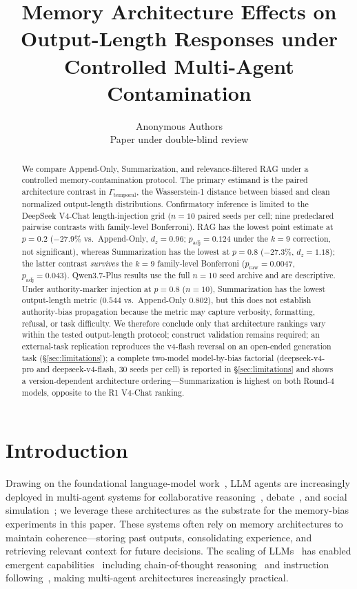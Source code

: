 \documentclass[11pt]{article}
\title{Memory Architecture Effects on Output-Length Responses under Controlled Multi-Agent Contamination}
\author{Anonymous Authors\\Paper under double-blind review}
\date{}
\begin{document}
\maketitle

\begin{abstract}
We compare Append-Only, Summarization, and relevance-filtered RAG under a controlled memory-contamination protocol. The primary estimand is the paired architecture contrast in $\Gamma_{\text{temporal}}$, the Wasserstein-1 distance between biased and clean normalized output-length distributions. Confirmatory inference is limited to the DeepSeek V4-Chat length-injection grid ($n{=}10$ paired seeds per cell; nine predeclared pairwise contrasts with family-level Bonferroni). RAG has the lowest point estimate at $p{=}0.2$ ($-27.9\%$ vs.\ Append-Only, $d_z{=}0.96$; $p_{\text{adj}}{=}0.124$ under the $k{=}9$ correction, not significant), whereas Summarization has the lowest at $p{=}0.8$ ($-27.3\%$, $d_z{=}1.18$); the latter contrast \emph{survives} the $k{=}9$ family-level Bonferroni ($p_{\text{raw}}{=}0.0047$, $p_{\text{adj}}{=}0.043$). Qwen3.7-Plus results use the full $n{=}10$ seed archive and are descriptive. Under authority-marker injection at $p{=}0.8$ ($n{=}10$), Summarization has the lowest output-length metric ($0.544$ vs.\ Append-Only $0.802$), but this does not establish authority-bias propagation because the metric may capture verbosity, formatting, refusal, or task difficulty. We therefore conclude only that architecture rankings vary within the tested output-length protocol; construct validation remains required; an external-task replication reproduces the v4-flash reversal on an open-ended generation task (\S\ref{sec:limitations}); a complete two-model model-by-bias factorial (deepseek-v4-pro and deepseek-v4-flash, 30 seeds per cell) is reported in \S\ref{sec:limitations} and shows a version-dependent architecture ordering---Summarization is highest on both Round-4 models, opposite to the R1 V4-Chat ranking.
\end{abstract}

\section{Introduction}
\label{sec:intro}

Drawing on the foundational language-model work~\cite{brown2020language,touvron2023llama,zhao2023survey}, LLM agents are increasingly deployed in multi-agent systems for collaborative reasoning~\cite{du2024improving}, debate~\cite{li2023camel,liang2023multiagent}, and social simulation~\cite{park2023generative}; we leverage these architectures as the substrate for the memory-bias experiments in this paper. These systems often rely on memory architectures to maintain coherence---storing past outputs, consolidating experience, and retrieving relevant context for future decisions. The scaling of LLMs~\cite{kaplan2020scaling} has enabled emergent capabilities~\cite{wei2022emergent} including chain-of-thought reasoning~\cite{wei2022chain} and instruction following~\cite{ouyang2022training}, making multi-agent architectures increasingly practical.
\end{document}
